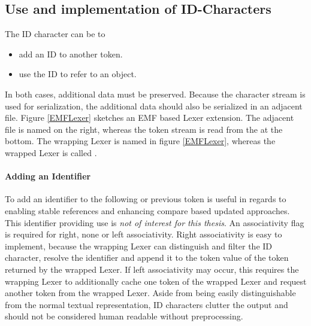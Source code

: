\subsection{Use and implementation of ID-Characters}
 
The ID character can be to
\begin{itemize}
	\item add an ID to another token.
	\item use the ID to refer to an object.
\end{itemize}
In both cases, additional data must be preserved. Because the character stream is used for serialization, the additional data should also be serialized in an adjacent file. Figure \ref{EMFLexer} sketches an EMF based Lexer extension. The adjacent file is named  on the right, whereas the token stream is read from the  at the bottom. The wrapping Lexer is named  in figure \ref{EMFLexer}, whereas the wrapped Lexer is called .  

\paragraph{Adding an Identifier} To add an identifier to the following or previous token is useful in regards to enabling stable references and enhancing compare based updated approaches. This identifier providing use is \emph{not of interest for this thesis}. An associativity flag is required for right, none or left associativity.  Right associativity is easy to implement, because the wrapping Lexer can distinguish and filter the ID character, resolve the identifier and append it to the token value of the token returned by the wrapped Lexer. If left associativity may occur, this requires the wrapping Lexer to additionally cache one token of the wrapped Lexer and request another token from the wrapped Lexer. Aside from being easily distinguishable from the normal textual representation, ID characters clutter the output and should not be considered human readable without preprocessing. 
 
